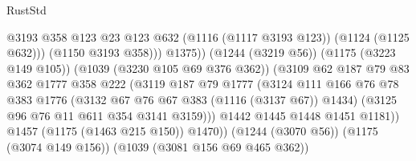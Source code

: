 \begin{lexlean}{RustStd}
\begin{coremodule}
                                                    @3193
                                                    @358
                                                    @123
                                                    @23
                                                    @123
                                                    @632
                                                    (@1116 (@1117 @3193 @123))
                                                    (@1124 (@1125 @632)))
                                                  (@1150 @3193 @358)))
                                              @1375))
                                          (@1244 (@3219 @56))
                                          (@1175 (@3223 @149 @105))
                                          (@1039 (@3230 @105 @69 @376 @362))
                                          (@3109
                                            @62
                                            @187
                                            @79
                                            @83
                                            @362
                                            @1777
                                            @358
                                            @222
                                            (@3119
                                              @187
                                              @79
                                              @1777
                                              (@3124
                                                @111
                                                @166
                                                @76
                                                @78
                                                @383
                                                @1776
                                                (@3132 @67 @76 @67 @383 (@1116 (@3137 @67)) @1434)
                                                (@3125 @96 @76 @11 @611 @354 @3141 @3159)))
                                            @1442
                                            @1445
                                            @1448
                                            @1451
                                            @1181))
                                        @1457
                                        (@1175 (@1463 @215 @150))
                                        @1470))
                                    (@1244 (@3070 @56))
                                    (@1175 (@3074 @149 @156))
                                    (@1039 (@3081 @156 @69 @465 @362))

\end{coremodule}
\end{lexlean}
